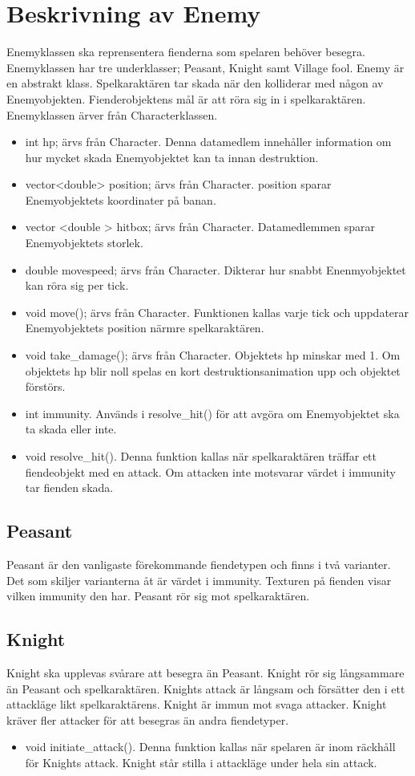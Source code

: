 \documentclass{TDP005mall}
\begin{document}
\section{Beskrivning av Enemy}
Enemyklassen ska reprensentera fienderna som spelaren behöver besegra. 
Enemyklassen har tre underklasser; Peasant, Knight samt Village fool. 
Enemy är en abstrakt klass. 
Spelkaraktären tar skada när den kolliderar med någon av Enemyobjekten. 
Fienderobjektens mål är att röra sig in i spelkaraktären. 
Enemyklassen ärver från Characterklassen.
\begin{itemize}
\item int hp; ärvs från Character. 
    Denna datamedlem innehåller information om hur mycket skada Enemyobjektet kan ta innan destruktion.
\item vector<double> position; ärvs från Character. 
    position sparar Enemyobjektets koordinater på banan.
\item vector <double > hitbox; ärvs från Character. 
    Datamedlemmen sparar Enemyobjektets storlek.
\item double movespeed; ärvs från Character. 
    Dikterar hur snabbt Enenmyobjektet kan röra sig per tick.
\item void move(); ärvs från Character. 
    Funktionen kallas varje tick och uppdaterar Enemyobjektets position närmre spelkaraktären.
\item void take\_damage(); ärvs från Character. Objektets hp minskar med 1. Om objektets hp blir noll spelas en kort destruktionsanimation upp och objektet förstörs.
\item int immunity. 
    Används i resolve\_hit() för att avgöra om Enemyobjektet ska ta skada eller inte.
\item void resolve\_hit(). 
    Denna funktion kallas när spelkaraktären träffar ett fiendeobjekt med en attack. 
    Om attacken inte motsvarar värdet i immunity tar fienden skada.
\end{itemize}
\subsection{Peasant}
Peasant är den vanligaste förekommande fiendetypen och finns i två varianter. 
Det som skiljer varianterna åt är värdet i immunity. 
Texturen på fienden visar vilken immunity den har.
Peasant rör sig mot spelkaraktären. 
\subsection{Knight}
Knight ska upplevas svårare att besegra än Peasant. 
Knight rör sig långsammare än Peasant och spelkaraktären. 
Knights attack är långsam och försätter den i ett attackläge likt spelkaraktärens. 
Knight är immun mot svaga attacker. 
Knight kräver fler attacker för att besegras än andra fiendetyper.
\begin{itemize}
\item void initiate\_attack(). Denna funktion kallas när spelaren är inom räckhåll för Knights attack. 
    Knight står stilla i attackläge under hela sin attack.
\end{itemize}
\end{document}
